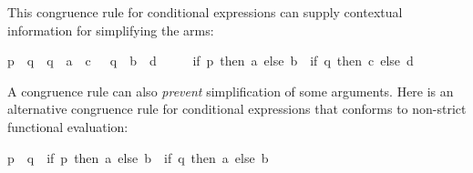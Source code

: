 \begin{isabellebody}
\begin{isamarkuptext}
  \medskip This congruence rule for conditional expressions can
  supply contextual information for simplifying the arms:
  \begin{isabelle}%
{}{}p\ {}\ {}q\ {}\ {}{}q\ {}\ {}a\ {}\ {}c{}\ {}\ {}{}\ {}q\ {}\ {}b\ {}\ {}d{}\ {}\isanewline
\ \ \ \ {}if\ {}p\ then\ {}a\ else\ {}b{}\ {}\ {}if\ {}q\ then\ {}c\ else\ {}d{}{}%
\end{isabelle}

  A congruence rule can also \emph{prevent} simplification of some
  arguments.  Here is an alternative congruence rule for conditional
  expressions that conforms to non-strict functional evaluation:
  \begin{isabelle}%
{}{}p\ {}\ {}q\ {}\ {}if\ {}p\ then\ {}a\ else\ {}b{}\ {}\ {}if\ {}q\ then\ {}a\ else\ {}b{}{}%
\end{isabelle}


\end{isamarkuptext}
\end{isabellebody}
